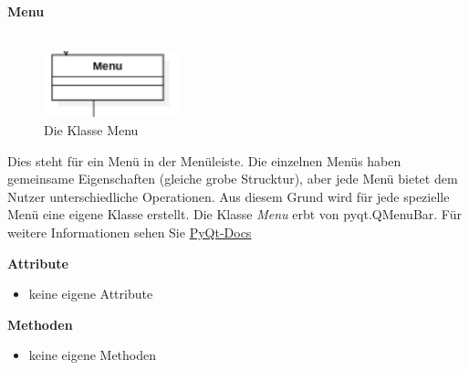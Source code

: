 \documentclass{article}
\begin{document}
\newpage
\textbf{\large{Menu}}\\\\
\begin{figure}[H]%
    \centering
    \includegraphics[width=4cm]{entwurf/Entwurf_dokument/img/Alissa/Menu.png}
    \caption{Die Klasse Menu}
\end{figure}
Dies steht für ein Menü in der Menüleiste. Die einzelnen Menüs haben gemeinsame Eigenschaften (gleiche grobe Strucktur), aber jede Menü bietet dem Nutzer unterschiedliche Operationen. Aus diesem Grund wird für jede spezielle Menü eine eigene Klasse erstellt.
Die Klasse \textit{Menu} erbt von pyqt.QMenuBar. Für weitere Informationen sehen Sie \href{https://doc.qt.io/qtforpython-5/PySide2/QtWidgets/QMenuBar.html}{PyQt-Docs}
\newline \newline

\textbf{{Attribute}}
\begin{itemize}
\item[] keine eigene Attribute \newline
\end{itemize}
    
\textbf{{Methoden}}
\begin{itemize}
\item[] keine eigene Methoden
\end{itemize}
\end{document}
